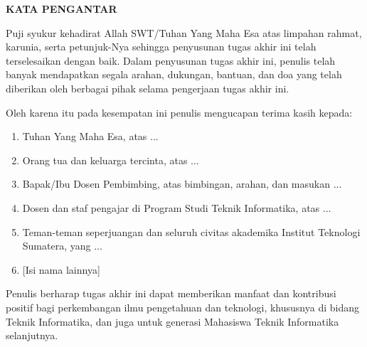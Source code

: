 \clearpage
{}%

\begin{justifying}
	\large \bfseries \centering \MakeUppercase{Kata Pengantar}\linebreak
	
	\normalsize \normalfont \justifying
	\textit{} \par
	Puji syukur kehadirat Allah SWT/Tuhan Yang Maha Esa atas limpahan rahmat, karunia, serta petunjuk-Nya sehingga penyusunan tugas akhir ini telah terselesaikan dengan baik. Dalam penyusunan tugas akhir ini, penulis telah banyak mendapatkan segala arahan, dukungan, bantuan, dan doa yang telah diberikan oleh berbagai pihak selama pengerjaan tugas akhir ini. \par
	Oleh karena itu pada kesempatan ini penulis mengucapan terima kasih kepada: \par
	\begin{enumerate}
		\item Tuhan Yang Maha Esa, atas ...
		\item Orang tua dan keluarga tercinta, atas ...		
		\item Bapak/Ibu Dosen Pembimbing, atas bimbingan, arahan, dan masukan ...
		\item Dosen dan staf pengajar di Program Studi Teknik Informatika, atas ...
		\item Teman-teman seperjuangan dan seluruh civitas akademika Institut Teknologi Sumatera, yang ...
		\item {[Isi nama lainnya]}
	\end{enumerate} \par
	Penulis berharap tugas akhir ini dapat memberikan manfaat dan kontribusi positif bagi perkembangan ilmu pengetahuan dan teknologi, khususnya di bidang Teknik Informatika, dan juga untuk generasi Mahasiswa Teknik Informatika selanjutnya.
	\vfill
	
\end{justifying}
\clearpage